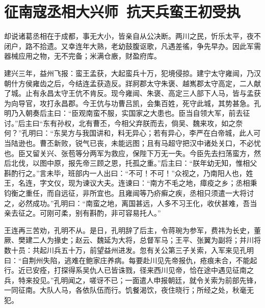 \chapter{征南寇丞相大兴师~抗天兵蛮王初受执}

却说诸葛丞相在于成都，事无大小，皆亲自从公决断。两川之民，忻乐太平，夜不闭户，路不拾遗。又幸连年大熟，老幼鼓腹讴歌，凡遇差徭，争先早办。因此军需器械应用之物，无不完备；米满仓廒，财盈府库。

建兴三年，益州飞报：蛮王孟获，大起蛮兵十万，犯境侵掠。建宁太守雍闿，乃汉朝什方侯雍齿之后，今结连孟获造反。牂牁郡太守朱褒、越嶲郡太守高定，二人献了城。止有永昌太守王伉不肯反。现今雍闿、朱褒、高定三人部下人马，皆与孟获为向导官，攻打永昌郡。今王伉与功曹吕凯，会集百姓，死守此城，其势甚急。孔明乃入朝奏后主曰：“臣观南蛮不服，实国家之大患也。臣当自领大军，前去征讨。”后主曰“东有孙权，北有曹丕，今相父弃朕而去，倘吴、魏来攻，如之奈何？”孔明曰：“东吴方与我国讲和，料无异心；若有异心，李严在白帝城，此人可当陆逊也。曹丕新败，锐气已丧，未能远图；且有马超守把汉中诸处关口，不必忧也。臣又留关兴、张苞等分两军为救应，保陛下万无一失。今臣先去扫荡蛮方，然后北伐，以图中原，报先帝三顾之恩，托孤之重。”后主曰：“朕年幼无知，惟相父斟酌行之。”言未毕，班部内一人出曰：“不可！不可！”众视之，乃南阳人也，姓王，名连，字文仪，现为谏议大夫。连谏曰：“南方不毛之地，瘴疫之乡；丞相秉钧衡之重任，而自远征，非所宜也。且雍闿等乃疥癣之疾，丞相只须遣一大将讨之，必然成功。”孔明曰：“南蛮之地，离国甚远，人多不习王化，收伏甚难，吾当亲去征之。可刚可柔，别有斟酌，非可容易托人。”

王连再三苦劝，孔明不从。是日，孔明辞了后主，令蒋琬为参军，费祎为长史，董厥、樊建二人为掾史；赵云、魏延为大将，总督军马；王平、张翼为副将；并川将数十员：共起川兵五十万，前望益州进发。忽有关公第三子关索，入军来见孔明曰：“自荆州失陷，逃难在鲍家庄养病。每要赴川见先帝报仇，疮痕未合，不能起行。近已安痊，打探得系吴仇人已皆诛戮，径来西川见帝，恰在途中遇见征南之兵，特来投见。”孔明闻之，嗟讶不已；一面遣人申报朝廷，就令关索为前部先锋，一同征南。大队人马，各依队伍而行。饥餐渴饮，夜住晓行；所经之处，秋毫无犯。


